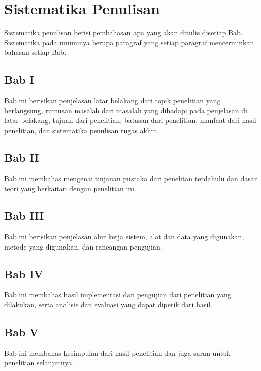 \section{Sistematika Penulisan} \label{I.Sistematika}
Sistematika penulisan berisi pembahasan apa yang akan ditulis disetiap Bab. Sistematika pada umumnya berupa paragraf yang setiap paragraf mencerminkan bahasan setiap Bab. \par

\subsection*{Bab I}
Bab ini berisikan penjelasan latar belakang dari topik penelitian yang berlangsung, rumusan masalah dari masalah yang dihadapi pada penjelasan di latar belakang, tujuan dari penelitian, batasan dari penelitian, manfaat dari hasil penelitian, dan sistematika penulisan tugas akhir. \par

\subsection*{Bab II}
Bab ini membahas mengenai tinjauan pustaka dari penelitan terdahulu dan dasar teori yang berkaitan dengan penelitian ini.

\subsection*{Bab III}
Bab ini berisikan penjelasan alur kerja sistem, alat dan data yang digunakan, metode yang digunakan, dan rancangan pengujian.

\subsection*{Bab IV}
Bab ini membahas hasil implementasi dan pengujian dari penelitian yang dilakukan, serta analisis dan evaluasi yang dapat dipetik dari hasil.

\subsection*{Bab V}
Bab ini membahas kesimpulan dari hasil penelitian dan juga saran untuk penelitian selanjutnya.
